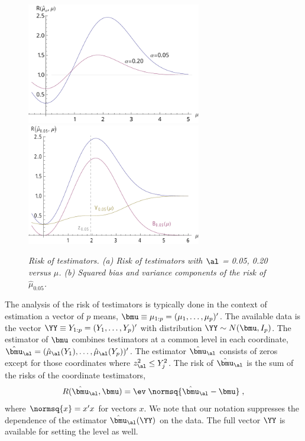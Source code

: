 \documentclass[12pt]{article}
\begin{document}
 \begin{figure}
 \caption{ \label{fig:risk} \sl Risk of testimators. (a) Risk of testimators with
 $\al$ = 0.05, 0.20 versus $\mu$. (b) Squared bias and variance components of the
 risk of $\hat\mu_{0.05}$. } 
 \vspace{0.1in}
\centerline{
 \includegraphics[width=3.0in]{figures/risk_a}
 \includegraphics[width=3.0in]{figures/risk_b} }
 \vspace{0.2in}
 \end{figure}
 

 The analysis of the risk of testimators is typically done in the context of
 estimation a vector of $p$ means, $\bmu \equiv \mu_{1:p} =
 (\mu_1,\ldots,\mu_p)'$.  The available data is the vector $\YY \equiv Y_{1:p} =
 (Y_1, \ldots, Y_p)'$ with distribution $\YY \sim N(\bmu,I_p)$.  The estimator
 of $\bmu$ combines testimators at a common level in each coordinate,
 $\hat{\bmu}_\al = (\hat\mu_\al(Y_1), \ldots, \hat\mu_\al(Y_p))'$.  The estimator
 $\hat{\bmu}_\al$ consists of zeros except for those coordinates where $z_\al^2
 \le Y_j^2$.  The risk of $\hat{\bmu}_\al$ is the sum of the risks of the
 coordinate testimators,
 \begin{equation}
    R(\hat{\bmu}_\al, \bmu) 
      = \ev\; \normsq{\hat{\bmu}_\al - \bmu} \;,
 \label{eq:risk}
 \end{equation}
 where $\normsq{x} = x'x$ for vectors $x$.  We note that our notation suppresses
 the dependence of the estimator $\hat{\bmu}_\al(\YY)$ on the data.  The full
 vector $\YY$ is available for setting the level as well.
\end{document}
